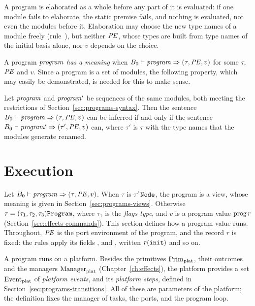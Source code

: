 \begin{rulecomments}
 A program is elaborated as a whole before any part of
it is evaluated: if one module fails to elaborate, the static premise fails,
and nothing is evaluated, not even the modules before it. Elaboration may
choose the new type names of a module freely (rule~), but
neither $\mathit{PE}$, whose types are built from type names of the initial basis
alone, nor $v$ depends on the choice.
\end{rulecomments}

A program $\mathit{program}$ \emph{has a meaning} when
$B_0 \vdash \mathit{program} \Rightarrow (\tau,\mathit{PE},v)$ for some $\tau$, $\mathit{PE}$ and $v$. Since a
program is a set of modules, the following property, which may easily be
demonstrated, is needed for this to make sense.
\begin{property}
Let $\mathit{program}$ and $\mathit{program}'$ be sequences of the same modules, both meeting
the restrictions of Section~\ref{sec:programs-syntax}. Then the sentence
$B_0 \vdash \mathit{program} \Rightarrow (\tau,\mathit{PE},v)$ can be inferred if and only if the
sentence $B_0 \vdash \mathit{program}' \Rightarrow (\tau',\mathit{PE},v)$ can, where $\tau'$ is $\tau$
with the type names that the modules generate renamed.
\end{property}

\section{Execution}\label{sec:programs-execution}

Let $B_0 \vdash \mathit{program} \Rightarrow (\tau,\mathit{PE},v)$. When $\tau$ is $\tau'\,\mathtt{Node}$, the
program is a view, whose meaning is given in
Section~\ref{sec:programs-views}. Otherwise
$\tau=(\tau_1,\tau_2,\tau_3)\mathtt{Program}$, where $\tau_1$ is the \emph{flags
type}, and $v$ is a program value $\mathrm{prog}\,r$
(Section~\ref{sec:effects-commands}). This section defines how a program
value runs. Throughout, $\mathit{PE}$ is the port environment of the program, and the
record $r$ is fixed: the rules apply its fields ,  and
, written $r(\textnormal{\texttt{init}})$ and so on.

A program runs on a platform. Besides the primitives $\mathrm{Prim}_{\mathrm{plat}}$, their
outcomes and the managers $\mathrm{Manager}_{\mathrm{plat}}$ (Chapter~\ref{ch:effects}), the
platform provides a set $\mathrm{Event}_{\mathrm{plat}}$ of \emph{platform events}, and its
\emph{platform steps}, defined in Section~\ref{sec:programs-transitions}. All
of these are parameters of the platform; the definition fixes the manager of
tasks, the ports, and the program loop. %


